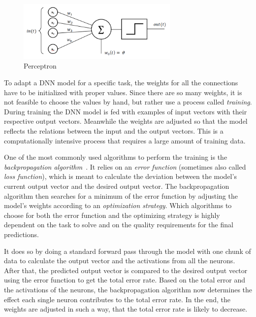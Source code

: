 \begin{figure}[h]
    \centering
    \includegraphics[width=0.7\textwidth]{images/perceptron}
    \caption{Perceptron}
    \label{fig:perceptron}
\end{figure}

To adapt a DNN model for a specific task, the weights for all the connections have to be initialized with proper values. Since there are so many weights, it is not feasible to choose the values by hand, but rather use a process called \emph{training}. During training the DNN model is fed with examples of input vectors with their respective output vectors. Meanwhile the weights are adjusted so that the model reflects the relations between the input and the output vectors. This is a computationally intensive process that requires a large amount of training data.

One of the most commonly used algorithms to perform the training is the \emph{backpropagation algorithm}~\cite[pp.~151ff]{nn_intro96}. It relies on an \emph{error function} (sometimes also called \emph{loss function}), which is meant to calculate the deviation between the model's current output vector and the desired output vector. The backpropagation algorithm
 then searches for a minimum of the error function by adjusting the model's weights according to an \emph{optimization strategy}. Which algorithms to choose for both the error function and the optimizing strategy is highly dependent on the task to solve and on the quality requirements for the final predictions.

It does so by doing a standard forward pass through the model with one chunk of data to calculate the output vector and the activations from all the neurons. After that, the predicted output vector is compared to the desired output vector using the error function to get the total error rate. Based on the total error and the activations of the neurons, the backpropagation algorithm now determines the effect each single neuron contributes to the total error rate. In the end, the weights are adjusted in such a way, that the total error rate is likely to decrease.


